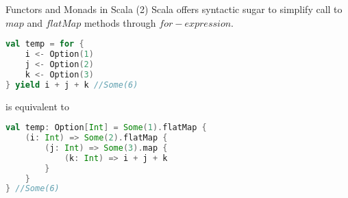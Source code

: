 \begin{frame}[fragile]{Functors and Monads in Scala (2)}
  	Scala offers syntactic sugar to simplify call to $map$ and $flatMap$
  	methods through $for-expression$.
\begin{lstlisting}[language=scala]
val temp = for {
	i <- Option(1)
	j <- Option(2)
	k <- Option(3)
} yield i + j + k //Some(6)	
\end{lstlisting}	
	is equivalent to
\begin{lstlisting}[language=scala]
 val temp: Option[Int] = Some(1).flatMap { 
	(i: Int) => Some(2).flatMap { 
		(j: Int) => Some(3).map {
			(k: Int) => i + j + k
		}
	}
} //Some(6)	
\end{lstlisting}		
\end{frame}